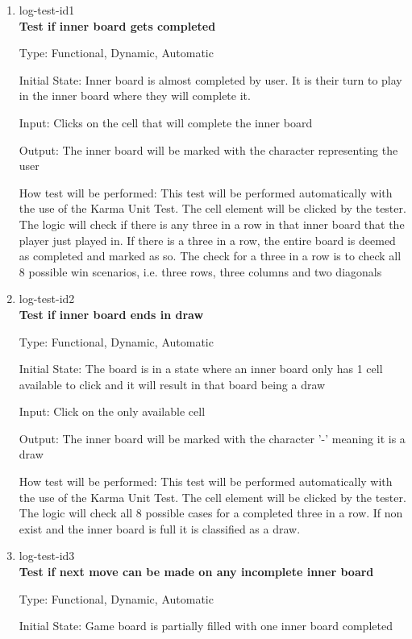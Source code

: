 \documentclass[12pt, titlepage]{article}
\begin{document}
\begin{enumerate}

\item{log-test-id1\\}
\textbf{Test if inner board gets completed}

Type: Functional, Dynamic, Automatic
					
Initial State: Inner board is almost completed by user. It is their turn to
play in the inner board where they will complete it.
					
Input: Clicks on the cell that will complete the inner board
					
Output: The inner board will be marked with the character representing the
user
					
How test will be performed: This test will be performed automatically with the
use of the Karma Unit Test. The cell element will be clicked by the tester.
The logic will check if there is any three in a row in that inner board that
the player just played in. If there is a three in a row, the entire board is
deemed as completed and marked as so. The check for a three in a row is to
check all 8 possible win scenarios, i.e. three rows, three columns and two
diagonals

\item{log-test-id2\\}
\textbf{Test if inner board ends in draw}

Type: Functional, Dynamic, Automatic
					
Initial State: The board is in a state where an inner board only has 1 cell
available to click and it will result in that board being a draw

Input: Click on the only available cell
					
Output: The inner board will be marked with the character '-' meaning it is a
draw
					
How test will be performed: This test will be performed automatically with the
use of the Karma Unit Test. The cell element will be clicked by the tester.
The logic will check all 8 possible cases for a completed three in a row. If
non exist and the inner board is full it is classified as a draw.

\item{log-test-id3\\}
\textbf{Test if next move can be made on any incomplete inner board}

Type: Functional, Dynamic, Automatic
					
Initial State: Game board is partially filled with one inner board completed


\end{enumerate}
\end{document}
